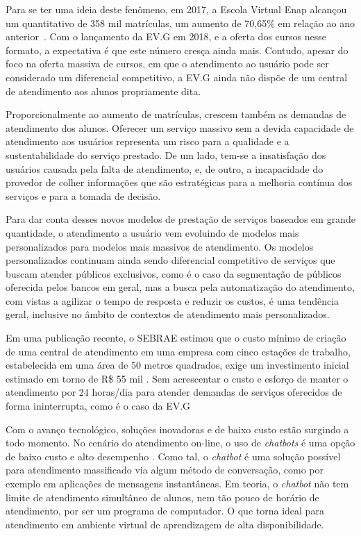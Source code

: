 Para se ter uma ideia deste fenômeno, em 2017, a Escola Virtual Enap alcançou um quantitativo de 358 mil matrículas, um aumento de 70,65\% em relação ao ano anterior~\cite{EVGnumeros}.
Com o lançamento da EV.G em 2018, e a oferta dos cursos nesse formato, a expectativa é que este número cresça ainda mais.
Contudo, apesar do foco na oferta massiva de cursos, em que o atendimento ao usuário pode ser considerado um diferencial competitivo, a EV.G ainda não dispõe de um central de atendimento aos alunos propriamente dita.

Proporcionalmente ao aumento de matrículas, crescem também as demandas de atendimento dos alunos. Oferecer um serviço massivo sem a devida capacidade de atendimento aos usuários representa um risco para a qualidade e a sustentabilidade do serviço prestado. De um lado, tem-se a insatisfação dos usuários causada pela falta de atendimento, e, de outro, a incapacidade do provedor de colher informações que são estratégicas para a melhoria contínua dos serviços e para a tomada de decisão.

Para dar conta desses novos modelos de prestação de serviços baseados em grande quantidade, o atendimento a usuário vem evoluindo de modelos mais personalizados para modelos mais massivos de atendimento. Os modelos personalizados continuam ainda sendo diferencial competitivo de serviços que buscam atender públicos exclusivos, como é o caso da segmentação de públicos oferecida pelos bancos em geral, mas a busca pela automatização do atendimento, com vistas a agilizar o tempo de resposta e reduzir os custos, é uma tendência geral, inclusive no âmbito de contextos de atendimento mais personalizados. 

Em uma publicação recente, o SEBRAE estimou que o custo mínimo de criação de uma central de atendimento em uma empresa com cinco estações de trabalho, estabelecida em uma área de 50 metros quadrados, exige um investimento inicial estimado em torno de R\$ 55 mil \cite{SebraeCallCenter}.
Sem acrescentar o custo e esforço de manter o atendimento por 24 horas/dia para atender demandas de serviços oferecidos de forma ininterrupta, como é o caso da EV.G

Com o avanço tecnológico, soluções inovadoras e de baixo custo estão surgindo a todo momento.
No cenário do atendimento on-line, o uso de \textit{chatbots} é uma opção de baixo custo e alto desempenho \cite{CallCenterInf}.
Como tal, o \textit{chatbot} é uma solução possível para atendimento massificado via algum método de conversação, como por exemplo em aplicações de mensagens instantâneas.
Em teoria, o \textit{chatbot} não tem limite de atendimento simultâneo de alunos, nem tão pouco de horário de atendimento, por ser um programa de computador.
O que torna ideal para atendimento em ambiente virtual de aprendizagem de alta disponibilidade.

